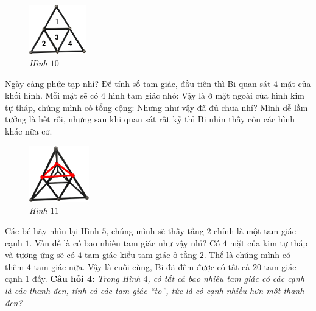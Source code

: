 	\vskip 0.1cm
	\begin{figure}
		\centering
		\vspace*{-10pt}
		\captionsetup{labelformat= empty, justification=centering} \includegraphics[width=0.22\textwidth]{10}
		\caption{\small\textit{Hình $10$}}
		\vspace*{-15pt}
	\end{figure}
	Ngày càng phức tạp nhỉ? Để tính số tam giác, đầu tiên thì Bi quan sát $4$ mặt của khối hình. Mỗi mặt sẽ có $4$ hình tam giác nhỏ:
	\vskip 0.1cm
	Vậy là ở mặt ngoài của hình kim tự tháp, chúng mình có tổng cộng:
	\vskip 0.1cm
	\vskip 0.1cm
	\vspace*{5pt}
	Nhưng như vậy đã đủ chưa nhỉ? Mình dễ lầm tưởng là hết rồi, nhưng sau khi quan sát rất kỹ thì Bi nhìn thấy còn các hình khác nữa cơ.
	\vskip 0.1cm
	\begin{figure}
		\centering
		\vspace*{-15pt}
		\captionsetup{labelformat= empty, justification=centering} \includegraphics[width=0.23\textwidth]{11}
		\vspace*{-5pt}
		\caption{\small\textit{Hình $11$}}
		\vspace*{-20pt}
	\end{figure}
	\vspace*{-1pt}
	Các bé hãy nhìn lại Hình $5$, chúng mình sẽ thấy tầng $2$ chính là một tam giác cạnh $1$. Vấn đề là có bao nhiêu tam giác như vậy nhỉ? Có $4$ mặt của kim tự tháp và tương ứng sẽ có $4$ tam giác kiểu tam giác ở tầng $2$. Thế là chúng mình có thêm $4$ tam giác nữa.
	\vskip 0.15cm
	Vậy là cuối cùng, Bi đã đếm được có tất cả $20$ tam giác cạnh $1$ đấy.
	\vskip 0.1cm
	\textbf{\color{toancuabi}Câu hỏi $\pmb{4}$:} \textit{Trong Hình $4$, có tất cả bao nhiêu tam giác có các cạnh là các thanh đen, tính cả các tam giác “to”, tức là có cạnh nhiều hơn một thanh đen?}
